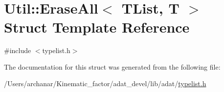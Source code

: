 \hypertarget{structUtil_1_1TL_1_1EraseAll}{}\section{Util\+:\+:Erase\+All$<$ T\+List, T $>$ Struct Template Reference}
\label{structUtil_1_1TL_1_1EraseAll}


{\ttfamily \#include $<$typelist.\+h$>$}



The documentation for this struct was generated from the following file\+:\begin{DoxyCompactItemize}
\item 
/\+Users/archanar/\+Kinematic\+\_\+factor/adat\+\_\+devel/lib/adat/\mbox{\hyperlink{lib_2adat_2typelist_8h}{typelist.\+h}}\end{DoxyCompactItemize}
